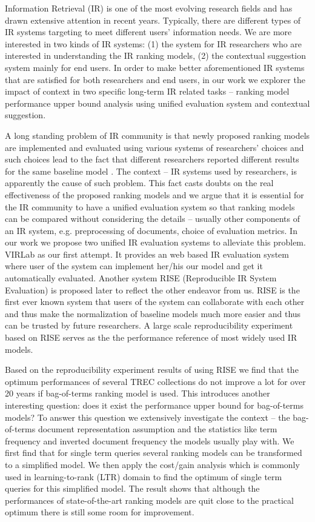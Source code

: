 %
%
Information Retrieval (IR) is one of the most evolving research fields 
and has drawn extensive attention in recent years. 
Typically, there are different types of IR systems targeting to meet 
different users' information needs. We are more interested in two kinds of 
IR systems: (1) the system for IR researchers who are interested in 
understanding the IR ranking models, (2) the contextual suggestion system 
mainly for end users.
In order to make better aforementioned IR systems that are satisfied 
for both researchers and end users, in our work we explorer the impact of 
context in two specific long-term IR related tasks -- ranking model 
performance upper bound analysis using unified evaluation system 
and contextual suggestion.

A long standing problem of IR community is that newly proposed ranking models 
are implemented and evaluated using various systems of researchers' choices 
and such choices lead to the fact that different researchers reported 
different results for the same baseline model \cite{Yang:2016:RSI:2970398.2970415}. 
The context -- IR systems used by researchers, 
is apparently the cause of such problem. This fact casts doubts on the real 
effectiveness of the proposed ranking models and we argue that it is 
essential for the IR community to have a unified evaluation system so that 
ranking models can be compared without considering the details -- usually 
other components of an IR system, e.g. preprocessing of documents, choice of 
evaluation metrics. 
In our work we propose two unified IR evaluation systems to alleviate this problem. 
VIRLab as our first attempt. It provides an web based IR evaluation system 
where user of the system can implement her/his our model and get it 
automatically evaluated.
Another system RISE (Reproducible IR System Evaluation) is proposed later 
to reflect the other endeavor from us. 
RISE is the first ever known system that users of the system 
can collaborate with each other and thus make the normalization of baseline 
models much more easier and thus can be trusted by future researchers. 
A large scale reproducibility experiment based on RISE serves as the the 
performance reference of most widely used IR models.

Based on the reproducibility experiment results of using RISE we find that 
the optimum performances of several TREC collections do not improve a lot 
for over 20 years if bag-of-terms ranking model is used. 
This introduces another interesting question: does it exist the performance 
upper bound for bag-of-terms models? To answer this question we extensively 
investigate the context -- the bag-of-terms document representation 
assumption and the statistics like term frequency and inverted document 
frequency the models usually play with.
We first find that for single term queries several ranking models can be 
transformed to a simplified model. 
We then apply the cost/gain analysis which is commonly used in 
learning-to-rank (LTR) domain to find the optimum of single term queries 
for this simplified model.
The result shows that although the performances of state-of-the-art 
ranking models are quit close to the practical optimum there is still some 
room for improvement.


